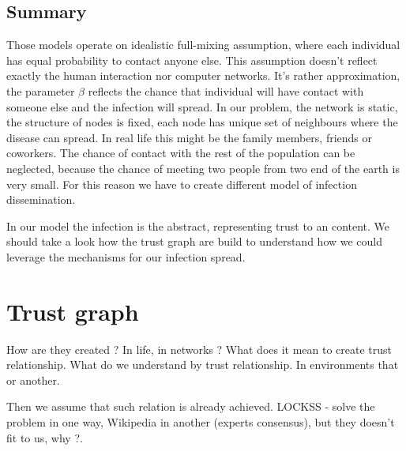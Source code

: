 \documentclass[nostrict]{szablonPG}
\begin{document}
\subsection{Summary}
Those models operate on idealistic full-mixing assumption, where each individual has equal probability to contact anyone else. This assumption doesn't reflect exactly the human interaction nor computer networks. It's rather approximation, the parameter $\beta$ reflects the chance that individual will have contact with someone else and the infection will spread. In our problem, the network is static, the structure of nodes is fixed, each node has unique set of neighbours where the disease can spread. In real life this might be the family members, friends or coworkers. The chance of contact with the rest of the population can be neglected, because the chance of meeting two people from two end of the earth is very small. For this reason we have to create different model of infection dissemination. 

In our model the infection is the abstract, representing trust to an content. We should take a look how the trust graph are build to understand how we could leverage the mechanisms for our infection spread.


\section{Trust graph}
How are they created ? In life, in networks ? What does it mean to create trust relationship. What do we understand by trust relationship. In environments that or another. 

Then we assume that such relation is already achieved. 
LOCKSS - solve the problem in one way, Wikipedia in another (experts consensus), but they doesn't fit to us, why ?. 
\end{document}
